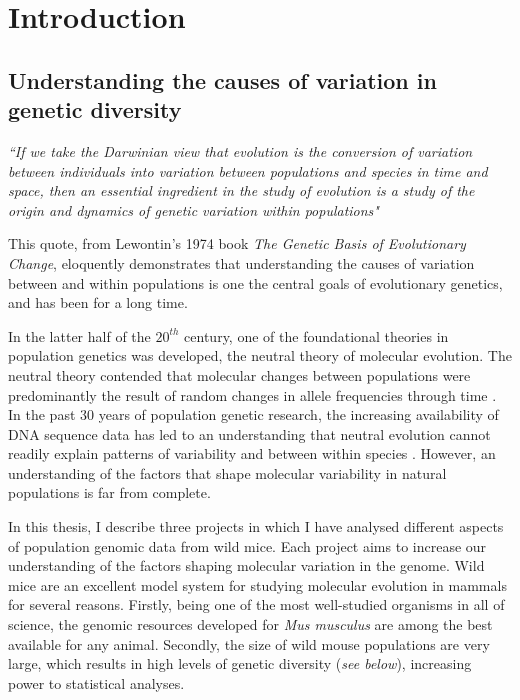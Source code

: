 \chapter{Introduction}

\section{Understanding the causes of variation in genetic diversity}

	\textit{``If we take the Darwinian view that evolution is the conversion of variation between individuals into variation between populations and species in time and space, then an essential ingredient in the study of evolution is a study of the origin and dynamics of genetic variation within populations"}\citep{RN183}

\noindent
This quote, from Lewontin's 1974 book \textit{The Genetic Basis of Evolutionary Change}, eloquently demonstrates that understanding the causes of variation between and within populations is one the central goals of evolutionary genetics, and has been for a long time.
	
	 In the latter half of the $20^{th}$ century, one of the foundational theories in population genetics was developed, the neutral theory of molecular evolution. The neutral theory contended that molecular changes between populations were predominantly the result of random changes in allele frequencies through time \citep{RN175}. In the past 30 years of population genetic research, the increasing availability of DNA sequence data has led to an understanding that neutral evolution cannot readily explain patterns of variability and between within species \citep{RN358}. However, an understanding of the factors that shape molecular variability in natural populations is far from complete.

	In this thesis, I describe three projects in which I have analysed different aspects of population genomic data from wild mice. Each project aims to increase our understanding of the factors shaping molecular variation in the genome. Wild mice are an excellent model system for studying molecular evolution in mammals for several reasons. Firstly, being one of the most well-studied organisms in all of science, the genomic resources developed for \textit{Mus musculus} are among the best available for any animal. Secondly, the size of wild mouse populations are very large, which results in high levels of genetic diversity (\textit{see below}), increasing power to statistical analyses. 

